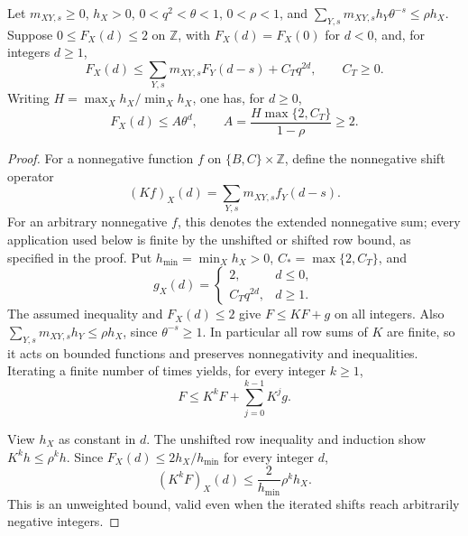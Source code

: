 \begin{lemma}\label{l:renewal}
Let \(m_{XY,s}\ge0\), \(h_X>0\), \(0<q^2<\theta<1\),
\(0<\rho<1\), and
\(\sum_{Y,s}m_{XY,s}h_Y\theta^{-s}\le\rho h_X\).
Suppose \(0\le F_X(d)\le2\) on \(\mathbb Z\), with
\(F_X(d)=F_X(0)\) for \(d<0\), and, for integers \(d\ge1\),
\[
 F_X(d)\le\sum_{Y,s}m_{XY,s}F_Y(d-s)+C_Tq^{2d},
 \qquad C_T\ge0.
\]
Writing \(H=\max_Xh_X/\min_Xh_X\), one has, for \(d\ge0\),
\[
 F_X(d)\le A\theta^d,\qquad
 A=\frac{H\max\{2,C_T\}}{1-\rho}\ge2 .
\]
\end{lemma}

\begin{proof}
For a nonnegative function \(f\) on \(\{B,C\}\times\mathbb Z\),
define the nonnegative shift operator
\[
 (Kf)_X(d)=\sum_{Y,s}m_{XY,s}f_Y(d-s).
\]
For an arbitrary nonnegative \(f\), this denotes the extended
nonnegative sum; every application used below is finite by the
unshifted or shifted row bound, as specified in the proof.
Put \(h_{\min}=\min_Xh_X>0\), \(C_*=\max\{2,C_T\}\), and
\[
 g_X(d)=
 \begin{cases}2,&d\le0,\\ C_Tq^{2d},&d\ge1.\end{cases}
\]
The assumed inequality and \(F_X(d)\le2\) give \(F\le KF+g\)
on all integers.  Also
\(\sum_{Y,s}m_{XY,s}h_Y\le\rho h_X\), since
\(\theta^{-s}\ge1\).  In particular all row sums of \(K\)
are finite, so it acts on bounded functions and preserves
nonnegativity and inequalities.  Iterating a finite number of
times yields, for every integer \(k\ge1\),
\begin{equation}\label{e:rec-renewal-iterate}
 F\le K^kF+\sum_{j=0}^{k-1}K^jg.
\end{equation}

View \(h_X\) as constant in \(d\).  The unshifted row inequality
and induction show \(K^kh\le\rho^kh\).  Since
\(F_X(d)\le2h_X/h_{\min}\) for every integer \(d\),
\begin{equation}\label{e:rec-renewal-remainder}
 (K^kF)_X(d)\le\frac{2}{h_{\min}}\rho^kh_X.
\end{equation}
This is an unweighted bound, valid even when the iterated shifts
reach arbitrarily negative integers.


\end{proof}
